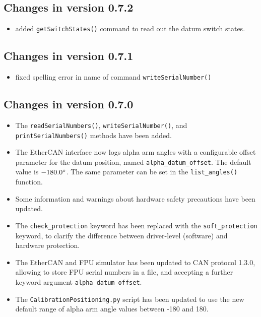 \documentclass[11pt,a4paper]{report}
\begin{document}
\subsection*{Changes in version 0.7.2}
\begin{itemize}
\item added \texttt{getSwitchStates()} command to read out
  the datum switch states.  
\end{itemize}


\subsection*{Changes in version 0.7.1}
\begin{itemize}
\item fixed spelling error in name of command \texttt{writeSerialNumber()}
  
\end{itemize}
\subsection*{Changes in version 0.7.0}
\begin{itemize}
\item The \texttt{readSerialNumbers()}, \texttt{writeSerialNumber()},
  and \texttt{printSerialNumbers()} methods have been added.
  
\item The EtherCAN interface now logs alpha arm angles with a configurable offset
  parameter for the datum position, named
  \texttt{alpha\_datum\_offset}. The default value is
  $-180.0\degree$.  The same parameter can be set in the
  \texttt{list\_angles()} function.
  
\item Some information and warnings about hardware safety precautions
  have been updated.
  
\item The \texttt{check\_protection} keyword has been replaced
  with the \texttt{soft\_protection} keyword, to clarify
  the difference between driver-level (software) and
  hardware protection.
  
\item The EtherCAN and FPU simulator has been updated to CAN protocol
  1.3.0, allowing to store FPU serial numbers in a file, and accepting
  a further keyword argument \texttt{alpha\_datum\_offset}.
  
\item The \texttt{CalibrationPositioning.py} script has been updated
  to use the new default range of alpha arm angle values between -180 and 180.
\end{itemize}
\end{document}
